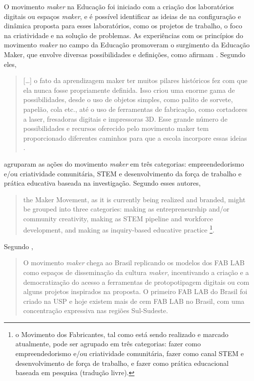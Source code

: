 \documentclass[portuguese]{textolivre}
\begin{document}
O movimento \textit{maker} na Educação foi iniciado com a criação dos laboratórios digitais ou espaços \textit{maker}, e é possível identificar as ideias de \textcite{papert_maquina_2007} na configuração e dinâmica proposta para esses laboratórios, como os projetos de trabalho, o foco na criatividade e na solução de problemas. As experiências com os princípios do movimento \textit{maker} no campo da Educação promoveram o surgimento da Educação Maker, que envolve diversas possibilidades e definições, como afirmam \textcite{blikstein_educacao_2020}. Segundo eles,

\begin{quote}
    [\ldots] o fato da aprendizagem maker ter muitos pilares históricos fez com que ela nunca fosse propriamente definida. Isso criou uma enorme gama de possibilidades, desde o uso de objetos simples, como palito de sorvete, papelão, cola etc., até o uso de ferramentas de fabricação, como cortadores a laser, fresadoras digitais e impressoras 3D. Esse grande número de possibilidades e recursos oferecido pelo movimento maker tem proporcionado diferentes caminhos para que a escola incorpore essas ideias \cite[p.~527]{blikstein_educacao_2020}.
\end{quote}

\textcite{vossoughi_making_2015} agruparam as ações do movimento \textit{maker} em três categorias: empreendedorismo e/ou criatividade comunitária, STEM e desenvolvimento da força de trabalho e prática educativa baseada na investigação. Segundo esses autores,

\begin{quote}
    the Maker Movement, as it is currently being realized and branded, might be grouped into three categories: making as entrepreneurship and/or community creativity, making as STEM pipeline and workforce development, and making as inquiry-based educative practice \cite[p.~5]{vossoughi_making_2015}\footnote{o Movimento dos Fabricantes, tal como está sendo realizado e marcado atualmente, pode ser agrupado em três categorias: fazer como empreendedorismo e/ou criatividade comunitária, fazer como canal STEM e desenvolvimento de força de trabalho, e fazer como prática educacional baseada em pesquisa (tradução livre).}.
\end{quote}

Segundo \textcite[p.~27]{carvalho_cultura_2018},

\begin{quote}
    O movimento \textit{maker} chega ao Brasil replicando os modelos dos FAB LAB como espaços de disseminação da cultura \textit{maker}, incentivando a criação e a democratização do acesso a ferramentas de protopotipagem digitais ou com alguns projetos inspirados na proposta. O primeiro FAB LAB do Brasil foi criado na USP e hoje existem mais de cem FAB LAB no Brasil, com uma concentração expressiva nas regiões Sul-Sudeste.
\end{quote}
\end{document}
